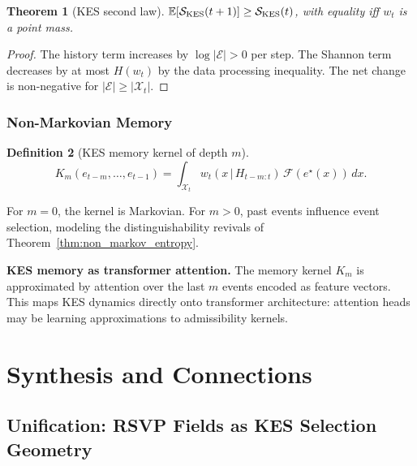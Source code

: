 \documentclass[11pt, openright, twoside]{book}
\theoremstyle{plain}
\newtheorem{theorem}{Theorem}[chapter]
\theoremstyle{definition}
\newtheorem{definition}[theorem]{Definition}
\theoremstyle{remark}
\newcommand{\given}{\,|\,}
\begin{document}
\begin{theorem}[KES second law]
$\mathbb{E}[\mathcal{S}_{\rm KES}(t+1)]\geq\mathcal{S}_{\rm KES}(t)$, with equality iff
$w_t$ is a point mass.
\end{theorem}

\begin{proof}
The history term increases by $\log|\mathcal{E}|>0$ per step. The Shannon term decreases
by at most $H(w_t)$ by the data processing inequality. The net change is non-negative for
$|\mathcal{E}|\geq|\mathcal{X}_t|$.
\end{proof}

\section{Non-Markovian Memory}

\begin{definition}[KES memory kernel of depth $m$]
\label{def:kes_memory}
\begin{equation}
  K_m(e_{t-m},\ldots,e_{t-1}) = \int_{\mathcal{X}_t}
  w_t(x\given H_{t-m:t})\,\mathcal{F}(e^\star(x))\,dx.
  \label{eq:kes_memory}
\end{equation}
\end{definition}

For $m=0$, the kernel is Markovian. For $m>0$, past events influence event selection,
modeling the distinguishability revivals of Theorem~\ref{thm:non_markov_entropy}.

\begin{implbox}
\textbf{KES memory as transformer attention.} The memory kernel $K_m$ is approximated by
attention over the last $m$ events encoded as feature vectors. This maps KES dynamics
directly onto transformer architecture: attention heads may be learning approximations to
admissibility kernels.
\end{implbox}

\part{Synthesis and Connections}

\chapter{Unification: RSVP Fields as KES Selection Geometry}
\end{document}
